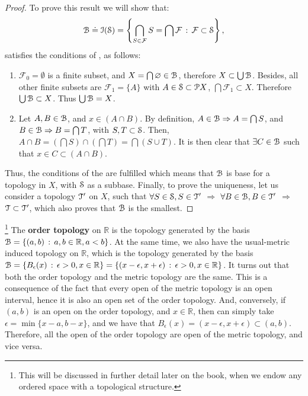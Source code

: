 \begin{proof}
	To prove this result we will show that:
	\[
	\B\doteq \I(\S)=\left\{\bigcap\limits_{S\in\mathcal{F}} S=\bigcap\mathcal{F}\,:\,\mathcal{F}\subset \S\right\},
	\]
	satisfies the conditions of , as follows:
	\begin{enumerate}
		\item $\mathcal{F}_{0}=\emptyset$ is a finite subset, and $X=\bigcap \emptyset\in\B$, therefore $X\subset
		\bigcup\B$.
		Besides, all other finite subsets are $\mathcal{F}_{1}=\{A\}$ with $A\in\S
		\subset\P X$, $\bigcap\mathcal{F}_{1}\subset X$.
		Therefore $\bigcup \B\subset X$.
		Thus $\bigcup\B = X$.
		\item Let $A, B\in \B$, and $x\in (A\cap B)$.
		By definition, $A\in\B \Rightarrow A=\bigcap S$,
		and $B\in \B \Rightarrow B =\bigcap T$, with $S, T\subset \S$.
		Then, $A\cap B = \left(\bigcap S\right)\cap\left(\bigcap T\right)=\bigcap (S\cup T)$.
		It is then clear that $\exists C\in\B$ such that $x\in C\subset (A\cap B)$.
	\end{enumerate}
	Thus, the conditions of the  are fulfilled which means that
	$\B$ is base for a topology in $X$, with $\S$ as a subbase.
	Finally, to prove the uniqueness, let us consider a topology $\T'$ on $X$, 
	such that $\forall S\in \S, S\in \T'$ $\Rightarrow$ $\forall B\in\B, B\in\T'$ 
	$\Rightarrow$ $\T\subset \T'$, which also proves that $\B$ is the smallest.
\end{proof}

\begin{example}
	\footnote{This will be discussed in further detail later on the book, when
	we endow any ordered space with a topological structure.}
	The \textbf{order topology} on $\mathbb{R}$ is the topology generated by the
	basis $\B=\setdef{(a,b)}{a,b\in\mathbb{R}, a<b}$. At the same time, we also have
	the usual-metric induced topology on $\mathbb{R}$, which is the topology
	generated by the basis $\B=\setdef{B_\epsilon(x)}{\epsilon>0, x\in\mathbb{R}} = \setdef{(x-\epsilon, x+\epsilon)}{\epsilon>0, x\in\mathbb{R}}$.
	It turns out that both the order topology and the metric topology are the same.
	This is a consequence of the fact that every open of the metric topology is an
	open interval, hence it is also an open set of the order topology. And, conversely,
	if $(a,b)$ is an open on the order topology, and $x\in\mathbb{R}$, then can simply
	take $\epsilon=\min\{x-a, b-x\}$, and we have that $B_\epsilon(x)=(x-\epsilon, x+\epsilon)\subset (a,b)$.
	Therefore, all the open of the order topology are open of the metric topology, and
	vice versa.
\end{example}

